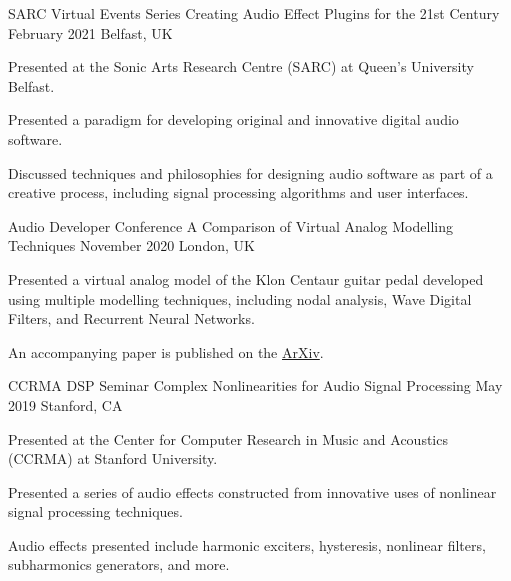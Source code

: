 \begin{cventries}
  \cventry
    {SARC Virtual Events Series} %
    {Creating Audio Effect Plugins for the 21st Century} %
    {February 2021} %
    {Belfast, UK} %
    {
      \begin{cvitems} %
        \item {Presented at the Sonic Arts Research Centre (SARC) at Queen's University Belfast.}
        \item {Presented a paradigm for developing original and innovative digital audio software.}
        \item {Discussed techniques and philosophies for designing audio software as part of a creative process,
               including signal processing algorithms and user interfaces.}
      \end{cvitems}
    }

  \cventry
    {Audio Developer Conference} %
    {A Comparison of Virtual Analog Modelling Techniques} %
    {November 2020} %
    {London, UK} %
    {
      \begin{cvitems} %
        \item {Presented a virtual analog model of the Klon Centaur guitar pedal
               developed using multiple modelling techniques, including nodal
               analysis, Wave Digital Filters, and Recurrent Neural Networks.}
        \item {An accompanying paper is published on the \href{https://arxiv.org/abs/2009.02833}{ArXiv}.}
      \end{cvitems}
    }

  \cventry
    {CCRMA DSP Seminar} %
    {Complex Nonlinearities for Audio Signal Processing} %
    {May 2019} %
    {Stanford, CA} %
    {
      \begin{cvitems} %
        \item {Presented at the Center for Computer Research in Music and Acoustics (CCRMA) at Stanford University.}
        \item {Presented a series of audio effects constructed from
               innovative uses of nonlinear signal processing techniques.}
        \item {Audio effects presented include harmonic exciters, hysteresis,
               nonlinear filters, subharmonics generators, and more.}
      \end{cvitems}
    }


\end{cventries}
